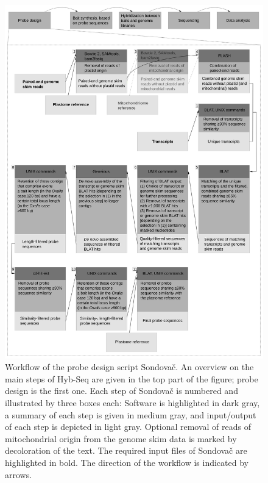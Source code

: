 \documentclass[a4paper, 11pt, twoside]{article}
\begin{document}
\begin{figure}[p]
\begin{center}
\includegraphics[width=15cm]{pipeline_workflow_grayscale.png}
\end{center}
\caption[Workflow of the probe design script Sondovač]{Workflow of the probe design script Sondovač. An overview on the main steps of Hyb-Seq are given in the top part of the figure; probe design is the first one. Each step of Sondovač is numbered and illustrated by three boxes each: Software is highlighted in dark gray, a summary of each step is given in medium gray, and input/output of each step is depicted in light gray. Optional removal of reads of mitochondrial origin from the genome skim data is marked by decoloration of the text. The required input files of Sondovač are highlighted in bold. The direction of the workflow is indicated by arrows.}
\label{pipeline-workflow}
\end{figure}
\end{document}

